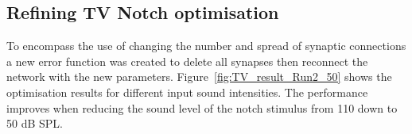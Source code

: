 


\subsection{Refining TV Notch optimisation}



To encompass the use of changing the number and spread of synaptic connections a
new error function was created to delete all synapses then reconnect the network
with the new parameters. Figure~\ref{fig:TV_result_Run2_50} shows the optimisation
results for different input sound intensities.  The performance improves when
reducing the sound level of the notch stimulus from 110 down to 50 dB SPL.

